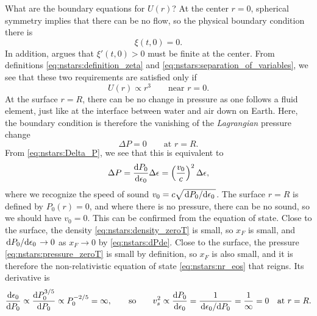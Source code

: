 What are the boundary equations for $U(r)$?
At the center $r = 0$, spherical symmetry implies that there can be no flow, so the physical boundary condition there is
\begin{equation}
	\xi(t, 0) = 0.
\label{eq:nstars:boundary_condition_center_physical}
\end{equation}
In addition, \cite{ref:stability_methods} argues that $\xi'(t,0) > 0$ must be finite at the center.
From definitions \eqref{eq:nstars:definition_zeta} and \eqref{eq:nstars:separation_of_variables}, we see that these two requirements are satisfied only if
\begin{equation}
	U(r) \propto r^3
	\qquad \text{near } r = 0.
\label{eq:nstars:boundary_condition_center_mathematical}
\end{equation}
At the surface $r = R$, there can be no change in pressure as one follows a fluid element, just like at the interface between water and air down on Earth.
Here, the boundary condition is therefore the vanishing of the \emph{Lagrangian} pressure change
\begin{equation}
	\Delta P = 0
	\qquad \text{at } r = R.
\label{eq:nstars:boundary_condition_surface_physical}
\end{equation}
From \cref{eq:nstars:Delta_P}, we see that this is equivalent to
\begin{equation}
	\Delta P = \odv{P_0}{\epsilon_0} \Delta \epsilon = \left( \frac{v_0}{c} \right)^2 \Delta\epsilon ,
\label{eq:nstars:deltaP_product}
\end{equation}
where we recognize the speed of sound $v_0 = c \sqrt{\odv{P_0}/{\epsilon_0}}$.
The surface $r = R$ is defined by $P_0(r) = 0$, and where there is no pressure, there can be no sound, so we should have $v_0 = 0$.
This can be confirmed from the equation of state.
Close to the surface, the density \eqref{eq:nstars:density_zeroT} is small, so $x_F$ is small, and $\odv{P_0}/{\epsilon_0} \rightarrow 0$ as $x_F \rightarrow 0$ by \cref{eq:nstars:dPde}.
\iffalse
Close to the surface, the pressure \eqref{eq:nstars:pressure_zeroT} is small by definition, so $x_F$ is also small, and it is therefore the non-relativistic equation of state \eqref{eq:nstars:nr_eos} that reigns.
Its derivative is
\begin{equation}
	\odv{\epsilon_0}{P_0} \propto \odv{P_0^{3/5}}{P_0} \propto P_0^{-2/5} = \infty ,
	\qquad \text{so} \qquad
	v_s^2 \propto \odv{P_0}{\epsilon_0} = \frac{1}{\odv{\epsilon_0}/{P_0}} = \frac{1}{\infty} = 0
	\quad \text{at } r = R.
\end{equation}
